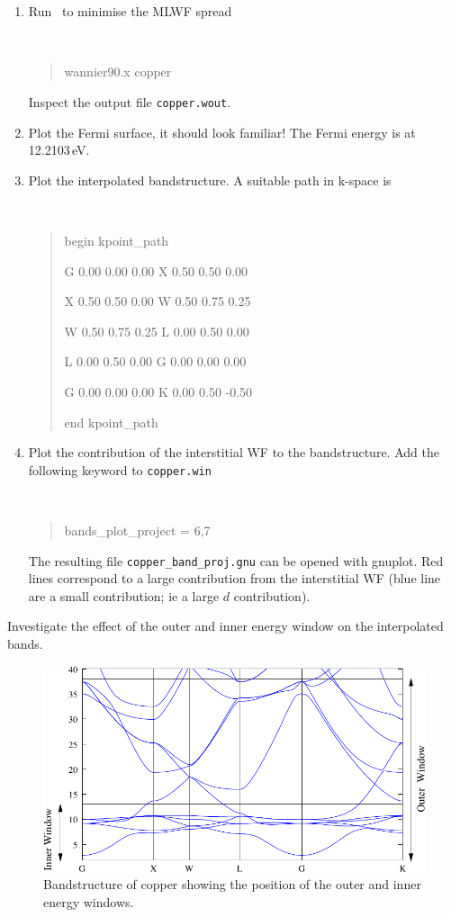 \documentclass[a4paper,11pt,twoside]{article}
\begin{document}
\begin{enumerate}
\item Run \wannier\ to minimise the MLWF spread
{\tt
\begin{quote}
wannier90.x copper
\end{quote} }
Inspect the output file {\tt copper.wout}. 

\item Plot the Fermi surface, it should look familiar! The Fermi
  energy is at 12.2103\,eV. 

\item Plot the interpolated bandstructure. A suitable path in k-space is
\smallskip
{\tt
\begin{quote}
begin kpoint\_path

G 0.00  0.00  0.00    X 0.50  0.50  0.00

X 0.50  0.50  0.00    W 0.50  0.75  0.25

W 0.50  0.75  0.25    L 0.00  0.50  0.00

L 0.00  0.50  0.00    G 0.00  0.00  0.00

G 0.00  0.00  0.00    K 0.00  0.50 -0.50
 
end kpoint\_path
\end{quote} }
\item Plot the contribution of the interstitial WF to the
  bandstructure. Add the following keyword to {\tt copper.win}
\smallskip
{\tt
\begin{quote}
bands\_plot\_project = 6,7
\end{quote} } The resulting file {\tt copper\_band\_proj.gnu} can be
opened with gnuplot. Red lines correspond to a large contribution from
the interstitial WF (blue line are a small contribution; ie a large
$d$ contribution).


\end{enumerate}




Investigate the effect of the outer and inner energy window on the
interpolated bands. 



\begin{figure}[h]
\begin{center}
\includegraphics{cu}
\caption{Bandstructure of copper showing the position of the outer
  and inner energy windows.} 
\label{fig:cu-bnd}
\end{center}
\end{figure}
\end{document}
